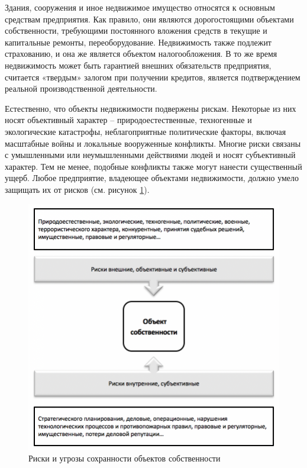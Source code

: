 \documentclass[a4paper,12pt,fleqn]{article} %
\begin{document}
Здания, сооружения и иное недвижимое имущество относятся к основным средствам предприятия. Как правило, они являются дорогостоящими объектами собственности, требующими постоянного вложения средств в текущие и капитальные ремонты, переоборудование. Недвижимость также подлежит страхованию, и она же является объектом налогообложения. В то же время недвижимость может быть гарантией внешних обязательств предприятия, считается «твердым» залогом при получении кредитов, является подтверждением реальной производственной деятельности.

Естественно, что объекты недвижимости подвержены рискам. Некоторые из них носят объективный характер – природоестественные, техногенные и экологические катастрофы, неблагоприятные политические факторы, включая масштабные войны и локальные вооруженные конфликты. Многие риски связаны с умышленными или неумышленными действиями людей и носят субъективный характер. Тем не менее, подобные конфликты также могут нанести существенный ущерб. Любое предприятие, владеющее объектами недвижимости, должно умело защищать их от рисков (см. рисунок \ref{image4}).

\begin{figure}[h]
	\centering
	\includegraphics[scale=0.7]{img4}
	\caption{Риски и угрозы сохранности объектов собственности}
	\label{image4}
\end{figure}
\end{document}
